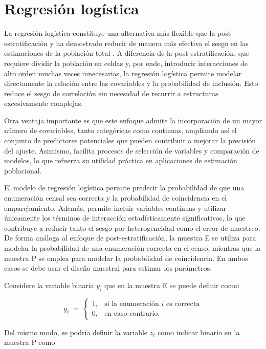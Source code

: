 \documentclass[
  12pt,
]{book}
\begin{document}
\section{Regresión logística}\label{regresiuxf3n-loguxedstica}

La regresión logística constituye una alternativa más flexible que la post-estratificación y ha demostrado reducir de manera más efectiva el sesgo en las estimaciones de la población total \citep{OlsonSands2012}. A diferencia de la post-estratificación, que requiere dividir la población en celdas y, por ende, introducir interacciones de alto orden muchas veces innecesarias, la regresión logística permite modelar directamente la relación entre las covariables y la probabilidad de inclusión. Esto reduce el sesgo de correlación sin necesidad de recurrir a estructuras excesivamente complejas.

Otra ventaja importante es que este enfoque admite la incorporación de un mayor número de covariables, tanto categóricas como continuas, ampliando así el conjunto de predictores potenciales que pueden contribuir a mejorar la precisión del ajuste. Asimismo, facilita procesos de selección de variables y comparación de modelos, lo que refuerza su utilidad práctica en aplicaciones de estimación poblacional.

El modelo de regresión logística permite predecir la probabilidad de que una enumeración censal sea correcta y la probabilidad de coincidencia en el emparejamiento. Además, permite incluir variables continuas y utilizar únicamente los términos de interacción estadísticamente significativos, lo que contribuye a reducir tanto el sesgo por heterogeneidad como el error de muestreo. De forma análoga al enfoque de post-estratificación, la muestra E se utiliza para modelar la probabilidad de una enumeración correcta en el censo, mientras que la muestra P se emplea para modelar la probabilidad de coincidencia. En ambos casos se debe usar el diseño muestral para estimar los parámetros.

Considere la variable binaria \(y_i\) que en la muestra E se puede definir como:

\[
y_i \;=\; 
\begin{cases}
1, & \text{si la enumeración $i$ es correcta}\\
0, & \text{en caso contrario.}
\end{cases}
\]

Del mismo modo, se podría definir la variable \(z_i\) como indicar binario en la muestra P como
\end{document}
